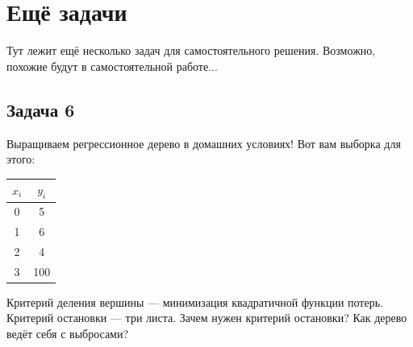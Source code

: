 \documentclass[12pt, a4paper, oneside]{article}
\begin{document}
\section{Ещё задачи} 

Тут лежит ещё несколько задач для самостоятельного решения. Возможно, похожие будут в самостоятельной работе... 

\subsection*{Задача 6}

Выращиваем регрессионное дерево в домашних условиях! Вот вам выборка для этого: 

\begin{center}
	\begin{tabular}{c|c}
		\hline
		$x_i$ & $y_i$ \\
		\hline
		0 & 5 \\
		1 &  6\\
		2 & 4 \\
		3 & 100 \\
	\end{tabular}
\end{center}

Критерий деления вершины --- минимизация квадратичной функции потерь. Критерий остановки --- три листа.  Зачем нужен критерий остановки? Как дерево ведёт себя с выбросами? 
\end{document}
